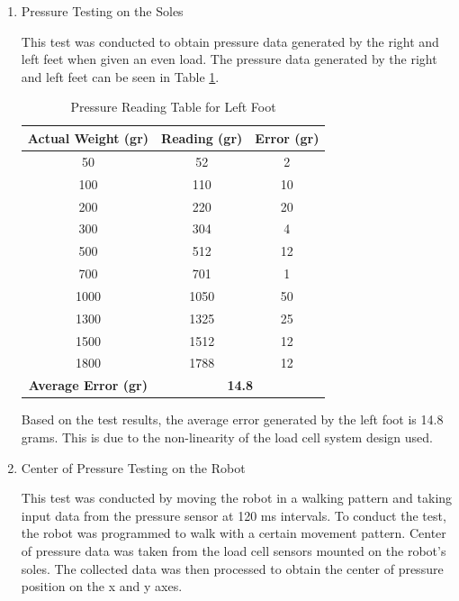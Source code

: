 \begin{enumerate}[label=\Alph*.]
    \item Pressure Testing on the Soles
    \label{subsec:results-discussion-pressure}

        \hspace*{1em} This test was conducted to obtain pressure data generated by the right and left feet when given an even load. The pressure data generated by the right and left feet can be seen in Table \ref{tab:pengukuran_berat_kaki}.

        \begin{table}[h!]
            \centering
            \caption{Pressure Reading Table for Left Foot}
            \begin{tabular}{|c|c|c|}
                \hline
                \textbf{Actual Weight (gr)} & \textbf{Reading (gr)} & \textbf{Error (gr)} \\
                \hline
                50    & 52    & 2   \\
                100   & 110   & 10  \\
                200   & 220   & 20  \\
                300   & 304   & 4   \\
                500   & 512   & 12  \\
                700   & 701   & 1   \\
                1000  & 1050  & 50  \\
                1300  & 1325  & 25  \\
                1500  & 1512  & 12  \\
                1800  & 1788  & 12  \\
                \hline
                \textbf{Average Error (gr)} & \multicolumn{2}{c|}{\textbf{14.8}} \\
                \hline
            \end{tabular}
            \label{tab:pengukuran_berat_kaki}
        \end{table}

        \hspace*{1em} Based on the test results, the average error generated by the left foot is 14.8 grams. This is due to the non-linearity of the load cell system design used.

    \item Center of Pressure Testing on the Robot
    \label{subsec:results-discussion-center-pressure}

        \hspace*{1em} This test was conducted by moving the robot in a walking pattern and taking input data from the pressure sensor at 120 ms intervals. To conduct the test, the robot was programmed to walk with a certain movement pattern. Center of pressure data was taken from the load cell sensors mounted on the robot's soles. The collected data was then processed to obtain the center of pressure position on the x and y axes.


\end{enumerate}

